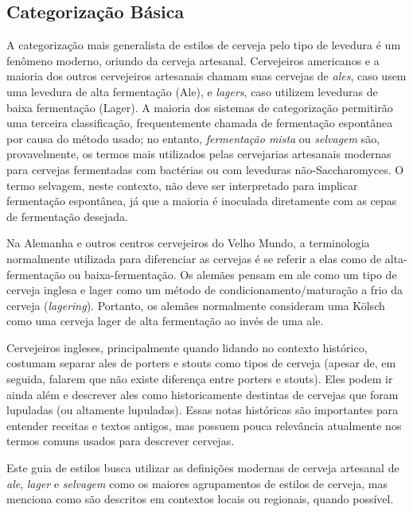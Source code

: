 \subsection*{Categorização Básica}
A categorização mais generalista de estilos de cerveja pelo tipo de levedura é um fenômeno moderno, oriundo da cerveja artesanal. Cervejeiros americanos e a maioria dos outros cervejeiros artesanais chamam suas cervejas de \textit{ales}, caso usem uma levedura de alta fermentação (Ale), e \textit{lagers}, caso utilizem leveduras de baixa fermentação (Lager). A maioria dos sistemas de categorização permitirão uma terceira classificação, frequentemente chamada de fermentação espontânea por causa do método usado; no entanto, \textit{fermentação mista} ou \textit{selvagem} são, provavelmente, os termos mais utilizados pelas cervejarias artesanais modernas para cervejas fermentadas com bactérias ou com leveduras não-Saccharomyces. O termo selvagem, neste contexto, não deve ser interpretado para implicar fermentação espontânea, já que a maioria é inoculada diretamente com as cepas de fermentação desejada.

Na Alemanha e outros centros cervejeiros do Velho Mundo, a terminologia normalmente utilizada para diferenciar as cervejas é se referir a elas como de alta-fermentação ou baixa-fermentação. Os alemães pensam em ale como um tipo de cerveja inglesa e lager como um método de condicionamento/maturação a frio da cerveja (\textit{lagering}). Portanto, os alemães normalmente consideram uma Kölsch como uma cerveja lager de alta fermentação ao invés de uma ale.

Cervejeiros ingleses, principalmente quando lidando no contexto histórico, costumam separar ales de porters e stouts como tipos de cerveja (apesar de, em seguida, falarem que não existe diferença entre porters e stouts). Eles podem ir ainda além e descrever ales como historicamente destintas de cervejas que foram lupuladas (ou altamente lupuladas). Essas notas históricas são importantes para entender receitas e textos antigos, mas possuem pouca relevância atualmente nos termos comuns usados para descrever cervejas.

Este guia de estilos busca utilizar as definições modernas de cerveja artesanal de \textit{ale}, \textit{lager} e \textit{selvagem} como os maiores agrupamentos de estilos de cerveja, mas menciona como são descritos em contextos locais ou regionais, quando possível.
